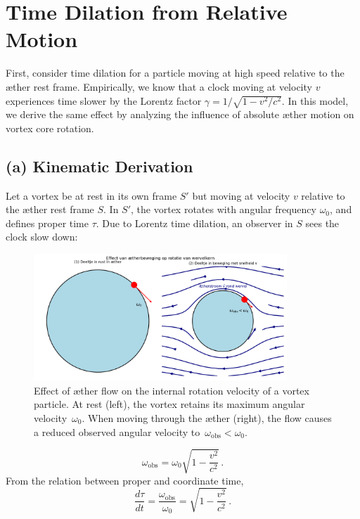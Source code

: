 
\section{Time Dilation from Relative Motion}

First, consider time dilation for a particle moving at high speed relative to the æther rest frame. Empirically, we know that a clock moving at velocity $v$ experiences time slower by the Lorentz factor $\gamma = 1/\sqrt{1 - v^2/c^2}$. In this model, we derive the same effect by analyzing the influence of absolute æther motion on vortex core rotation.

\subsection*{(a) Kinematic Derivation}

Let a vortex be at rest in its own frame $S'$ but moving at velocity $v$ relative to the æther rest frame $S$. In $S'$, the vortex rotates with angular frequency $\omega_0$, and defines proper time $\tau$. Due to Lorentz time dilation, an observer in $S$ sees the clock slow down:

\begin{figure}[htbp]
    \centering
    \includegraphics[width=0.85\textwidth]{../06-TijdsdilatatieBeweging}
    \caption{Effect of æther flow on the internal rotation velocity of a vortex particle. At rest (left), the vortex retains its maximum angular velocity~$\omega_0$. When moving through the æther (right), the flow causes a reduced observed angular velocity to~$\omega_{\mathrm{obs}} < \omega_0$.}
    \label{fig:TijdsdilatatieBeweging}
\end{figure}

\[
\omega_{\text{obs}} = \omega_0 \sqrt{1 - \frac{v^2}{c^2}} \,.
\]
From the relation between proper and coordinate time,
\[
\frac{d\tau}{dt} = \frac{\omega_{\text{obs}}}{\omega_0} = \sqrt{1 - \frac{v^2}{c^2}} \,. \tag{2}
\]

